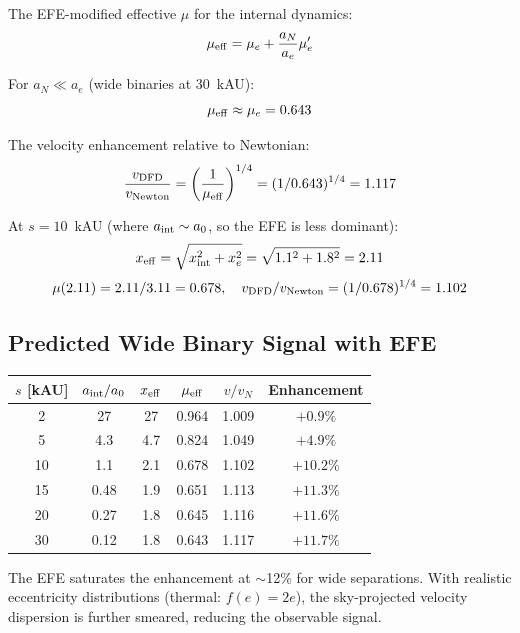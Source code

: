 \documentclass[11pt,a4paper]{article}
\begin{document}
The EFE-modified effective $\mu$ for the internal dynamics:
\begin{equation}
\mu_{\rm eff} = \mu_e + \frac{a_N}{a_e} \mu_e'
\end{equation}

For $a_N \ll a_e$ (wide binaries at 30~kAU):
\begin{equation}
\mu_{\rm eff} \approx \mu_e = 0.643
\end{equation}

The velocity enhancement relative to Newtonian:
\begin{equation}
\frac{v_{\rm DFD}}{v_{\rm Newton}} = \left(\frac{1}{\mu_{\rm eff}}
\right)^{1/4} = (1/0.643)^{1/4} = 1.117
\end{equation}

At $s = 10$~kAU (where $a_{\rm int} \sim a_0$, so the EFE is less
dominant):
\begin{equation}
x_{\rm eff} = \sqrt{x_{\rm int}^2 + x_e^2} = \sqrt{1.1^2 + 1.8^2}
= 2.11
\end{equation}
\begin{equation}
\mu(2.11) = 2.11/3.11 = 0.678, \quad
v_{\rm DFD}/v_{\rm Newton} = (1/0.678)^{1/4} = 1.102
\end{equation}

\subsection{Predicted Wide Binary Signal with EFE}

\begin{center}
\begin{tabular}{cccccc}
\toprule
$s$ [kAU] & $a_{\rm int}/a_0$ & $x_{\rm eff}$ & $\mu_{\rm eff}$ &
  $v/v_N$ & Enhancement \\
\midrule
2 & 27 & 27 & 0.964 & 1.009 & $+0.9\%$ \\
5 & 4.3 & 4.7 & 0.824 & 1.049 & $+4.9\%$ \\
10 & 1.1 & 2.1 & 0.678 & 1.102 & $+10.2\%$ \\
15 & 0.48 & 1.9 & 0.651 & 1.113 & $+11.3\%$ \\
20 & 0.27 & 1.8 & 0.645 & 1.116 & $+11.6\%$ \\
30 & 0.12 & 1.8 & 0.643 & 1.117 & $+11.7\%$ \\
\bottomrule
\end{tabular}
\end{center}

The EFE saturates the enhancement at $\sim$12\% for wide separations.
With realistic eccentricity distributions (thermal: $f(e) = 2e$), the
sky-projected velocity dispersion is further smeared, reducing the
observable signal.
\end{document}

